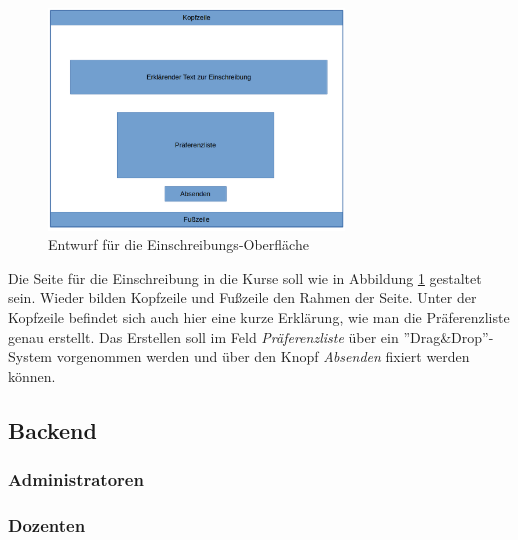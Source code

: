         \begin{figure}[t]
        	\centering
        	\includegraphics[width=0.7\textwidth]{./design/MockUpsFrontend/einschreibung.png}
        	\caption{Entwurf für die Einschreibungs-Oberfläche}
        	\label{mockupCourseChoiceFrontend}
        \end{figure}
        
        Die Seite für die Einschreibung in die Kurse soll wie in Abbildung \ref{mockupCourseChoiceFrontend} gestaltet sein.
        Wieder bilden Kopfzeile und Fußzeile den Rahmen der Seite.
        Unter der Kopfzeile befindet sich auch hier eine kurze Erklärung, wie man die Präferenzliste genau erstellt.
        Das Erstellen soll im Feld \textit{Präferenzliste} über ein ''Drag\&Drop''-System vorgenommen werden und über den Knopf \textit{Absenden} fixiert werden können.

    \subsection{Backend}
    	\subsubsection{Administratoren}
    	\subsubsection{Dozenten}